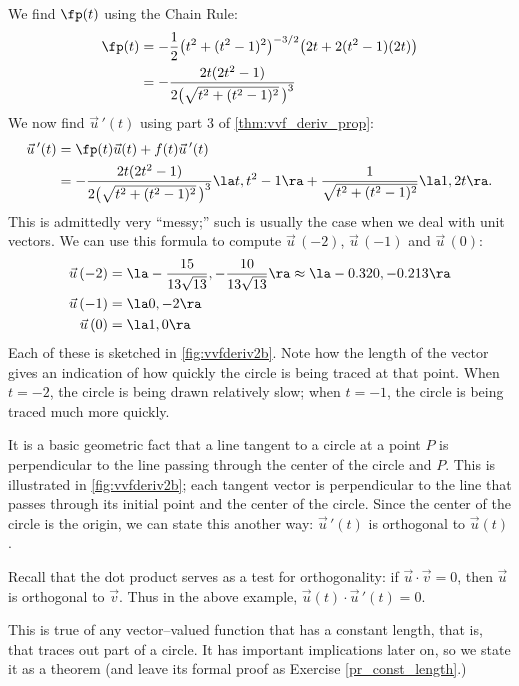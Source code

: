 {\begin{enumerate}
We find $\fp(t)$ using the Chain Rule:
\begin{align*}
\fp(t) &= -\frac12\big(t^2+(t^2-1)^2\big)^{-3/2}\big(2t+2(t^2-1)(2t)\big)\\
			&= -\frac{2t(2t^2-1)}{2\big(\sqrt{t^2+(t^2-1)^2}\,\big)^3}
\end{align*}
We now find $\vec u\,'(t)$ using part 3 of \autoref{thm:vvf_deriv_prop}:
\begin{align*}
\vec u\,'(t) &=  \fp(t)\vec u(t) + f(t)\vec u\,'(t) \\
				&=  -\frac{2t(2t^2-1)}{2\big(\sqrt{t^2+(t^2-1)^2}\,\big)^3}\la t,t^2-1\ra + \frac{1}{\sqrt{t^2+(t^2-1)^2}}\la 1,2t\ra.
\end{align*}
This is admittedly very ``messy;'' such is usually the case when we deal with unit vectors. We can use this formula to compute $\vec u\,(-2)$, $\vec u\,(-1)$ and $\vec u\,(0)$:
\begin{align*}
\vec u\,(-2) &= \la-\frac{15}{13 \sqrt{13}},-\frac{10}{13
   \sqrt{13}}\ra \approx \la -0.320,-0.213\ra\\
\vec u\,(-1) &= \la 0,-2\ra\\
\vec u\,(0) &= \la 1,0\ra
\end{align*}
Each of these is sketched in \autoref{fig:vvfderiv2b}. Note how the length of the vector gives an indication of how quickly the circle is being traced at that point. When $t=-2$, the circle is being drawn relatively slow; when $t=-1$, the circle is being traced much more quickly.\eoehere
\end{enumerate}}

It is a basic geometric fact that a line tangent to a circle at a point $P$ is perpendicular to the line passing through the center of the circle and $P$. This is illustrated in \autoref{fig:vvfderiv2b}; each tangent vector is perpendicular to the line that passes through its initial point and the center of the circle. Since the center of the circle is the origin, we can state this another way: $\vec u\,'(t)$ is orthogonal to $\vec u(t)$.

Recall that the dot product serves as a test for orthogonality: if $\vec u\cdot \vec v = 0$, then $\vec u$ is orthogonal to $\vec v$. Thus in the above example, $\vec u(t)\cdot \vec u\,'(t)=0$.

This is true of any vector--valued function that has a constant length, that is, that traces out part of a circle. It has important implications later on, so we state it as a theorem (and leave its formal proof as Exercise \ref{pr_const_length}.)

